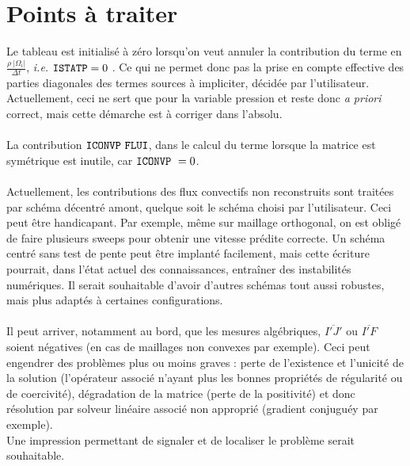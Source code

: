 \section*{Points à traiter}
Le tableau  est initialisé à zéro lorsqu'on veut annuler la
contribution du terme en
$\displaystyle\frac{\rho \ |\Omega_i|}{\Delta t}$, {\it i.e.} $\text{\texttt{ISTATP}} = 0 $ . Ce qui ne permet donc pas la prise en
compte effective des parties diagonales des termes sources à impliciter,
décidée par l'utilisateur. Actuellement, ceci ne sert que pour la variable
pression et reste donc {\it a priori} correct, mais cette démarche est à
corriger dans l'absolu.\\\\
La contribution $\var{ICONVP}\ \var{FLUI}$, dans le calcul du terme
 lorsque la matrice est symétrique est inutile, car
$\text{\texttt{ICONVP}}\ = 0$. \\\\
Actuellement, les contributions des  flux convectifs non reconstruits sont
traitées par schéma décentré amont, quelque soit le schéma choisi par
l'utilisateur. Ceci peut être handicapant. Par exemple, même sur
maillage orthogonal, on est obligé de faire plusieurs sweeps pour obtenir une
vitesse prédite correcte. Un schéma centré sans test de pente peut
être implanté facilement, mais cette écriture pourrait, dans l'état
actuel des connaissances, entraîner des instabilités
numériques. Il serait souhaitable d'avoir d'autres schémas tout aussi
robustes, mais plus adaptés à certaines configurations.\\\\
Il peut arriver, notamment au bord, que les mesures algébriques,
$\overline{I'J'}$ ou $\overline{I'F}$ soient négatives (en cas de maillages
non convexes par exemple). Ceci peut engendrer des problèmes plus ou moins
graves : perte de l'existence et l'unicité de la solution (l'opérateur associé n'ayant plus les bonnes propriétés de régularité
ou de coercivité), dégradation de la matrice (perte de la positivité) et donc résolution par solveur linéaire
associé non approprié (gradient conjuguéy par exemple).\\
Une impression permettant de signaler et de localiser le problème serait souhaitable.


